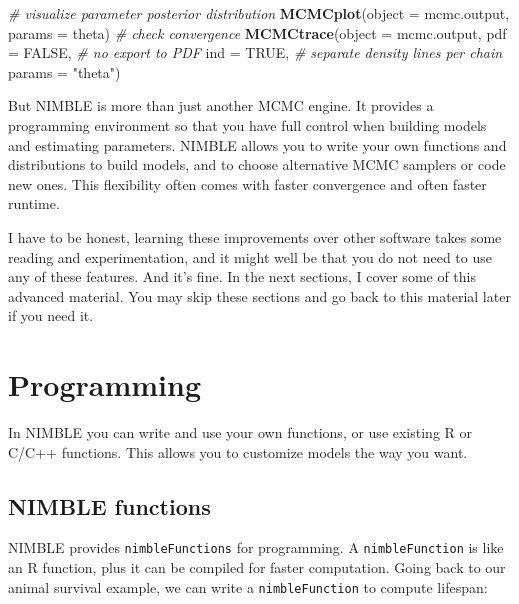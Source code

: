 \documentclass[
  12pt,
]{krantz}
\newenvironment{Shaded}{\begin{snugshade}}{\end{snugshade}}
\newcommand{\AttributeTok}[1]{\textcolor[rgb]{0.13,0.29,0.53}{#1}}
\newcommand{\CommentTok}[1]{\textcolor[rgb]{0.56,0.35,0.01}{\textit{#1}}}
\newcommand{\ConstantTok}[1]{\textcolor[rgb]{0.56,0.35,0.01}{#1}}
\newcommand{\FunctionTok}[1]{\textcolor[rgb]{0.13,0.29,0.53}{\textbf{#1}}}
\newcommand{\NormalTok}[1]{#1}
\newcommand{\StringTok}[1]{\textcolor[rgb]{0.31,0.60,0.02}{#1}}
\begin{document}
\begin{blackbox}
\begin{Shaded}
\begin{Highlighting}[]
\CommentTok{\# visualize parameter posterior distribution}
\FunctionTok{MCMCplot}\NormalTok{(}\AttributeTok{object =}\NormalTok{ mcmc.output, }
         \AttributeTok{params =} \StringTok{\textquotesingle{}theta\textquotesingle{}}\NormalTok{)}
\CommentTok{\# check convergence}
\FunctionTok{MCMCtrace}\NormalTok{(}\AttributeTok{object =}\NormalTok{ mcmc.output,}
          \AttributeTok{pdf =} \ConstantTok{FALSE}\NormalTok{, }\CommentTok{\# no export to PDF}
          \AttributeTok{ind =} \ConstantTok{TRUE}\NormalTok{, }\CommentTok{\# separate density lines per chain}
          \AttributeTok{params =} \StringTok{"theta"}\NormalTok{)}
\end{Highlighting}
\end{Shaded}

\end{blackbox}

But NIMBLE is more than just another MCMC engine. It provides a programming environment so that you have full control when building models and estimating parameters. NIMBLE allows you to write your own functions and distributions to build models, and to choose alternative MCMC samplers or code new ones. This flexibility often comes with faster convergence and often faster runtime.

I have to be honest, learning these improvements over other software takes some reading and experimentation, and it might well be that you do not need to use any of these features. And it's fine. In the next sections, I cover some of this advanced material. You may skip these sections and go back to this material later if you need it.

\section{Programming}\label{functions-in-nimble}

In NIMBLE you can write and use your own functions, or use existing R or C/C++ functions. This allows you to customize models the way you want.

\subsection{NIMBLE functions}\label{nimble-functions}

NIMBLE provides \texttt{nimbleFunctions} for programming. A \texttt{nimbleFunction} is like an R function, plus it can be compiled for faster computation. Going back to our animal survival example, we can write a \texttt{nimbleFunction} to compute lifespan:
\end{document}
